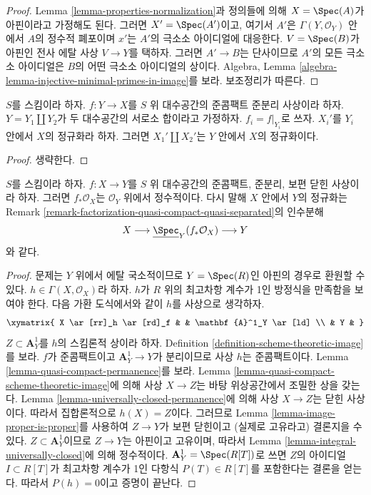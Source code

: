 \begin{proof}
Lemma \ref{lemma-properties-normalization}과 정의들에 의해
$X = \Spec(A)$가 아핀이라고 가정해도 된다. 그러면
$X' = \Spec(A')$이고, 여기서 $A'$은 $\Gamma(Y, \mathcal{O}_Y)$ 안에서
$A$의 정수적 폐포이며 $x'$는 $A'$의 극소소 아이디얼에 대응한다.
$V = \Spec(B)$가 아핀인 전사 에탈 사상 $V \to Y$를 택하자. 그러면
$A' \to B$는 단사이므로 $A'$의 모든 극소소 아이디얼은 $B$의 어떤
극소소 아이디얼의 상이다. Algebra, Lemma
\ref{algebra-lemma-injective-minimal-primes-in-image}를 보라. 보조정리가
따른다.
\end{proof}

\begin{lemma}
\label{lemma-normalization-in-disjoint-union}
$S$를 스킴이라 하자.
$f : Y \to X$를 $S$ 위 대수공간의 준콤팩트 준분리 사상이라 하자.
$Y = Y_1 \amalg Y_2$가 두 대수공간의 서로소 합이라고 가정하자.
$f_i = f|_{Y_i}$로 쓰자. $X_i'$를 $Y_i$ 안에서 $X$의 정규화라 하자.
그러면 $X_1' \amalg X_2'$는 $Y$ 안에서 $X$의 정규화이다.
\end{lemma}

\begin{proof}
생략한다.
\end{proof}

\begin{lemma}
\label{lemma-normalization-in-universally-closed}
$S$를 스킴이라 하자.
$f : X \to Y$를 $S$ 위 대수공간의 준콤팩트, 준분리, 보편 닫힌 사상이라
하자. 그러면 $f_*\mathcal{O}_X$는 $\mathcal{O}_Y$ 위에서 정수적이다.
다시 말해 $X$ 안에서 $Y$의 정규화는 Remark
\ref{remark-factorization-quasi-compact-quasi-separated}의 인수분해
$$
X \longrightarrow \underline{\Spec}_Y(f_*\mathcal{O}_X)
\longrightarrow Y
$$
와 같다.
\end{lemma}

\begin{proof}
문제는 $Y$ 위에서 에탈 국소적이므로 $Y = \Spec(R)$인 아핀의 경우로
환원할 수 있다. $h \in \Gamma(X, \mathcal{O}_X)$라 하자. $h$가 $R$ 위의
최고차항 계수가 1인 방정식을 만족함을 보여야 한다. 다음 가환 도식에서와
같이 $h$를 사상으로 생각하자.
$$
\xymatrix{
X \ar[rr]_h \ar[rd]_f & & \mathbf{A}^1_Y \ar[ld] \\
& Y &
}
$$
$Z \subset \mathbf{A}^1_Y$를 $h$의 스킴론적 상이라 하자. Definition
\ref{definition-scheme-theoretic-image}를 보라. $f$가 준콤팩트이고
$\mathbf{A}^1_Y \to Y$가 분리이므로 사상 $h$는 준콤팩트이다. Lemma
\ref{lemma-quasi-compact-permanence}를 보라. Lemma
\ref{lemma-quasi-compact-scheme-theoretic-image}에 의해 사상 $X \to Z$는
바탕 위상공간에서 조밀한 상을 갖는다. Lemma
\ref{lemma-universally-closed-permanence}에 의해 사상 $X \to Z$는
닫힌 사상이다. 따라서 집합론적으로 $h(X) = Z$이다. 그러므로 Lemma
\ref{lemma-image-proper-is-proper}를 사용하여 $Z \to Y$가 보편 닫힌이고
(실제로 고유라고) 결론지을 수 있다. $Z \subset \mathbf{A}^1_Y$이므로
$Z \to Y$는 아핀이고 고유이며, 따라서 Lemma
\ref{lemma-integral-universally-closed}에 의해 정수적이다.
$\mathbf{A}^1_Y = \Spec(R[T])$로 쓰면 $Z$의 아이디얼
$I \subset R[T]$가 최고차항 계수가 1인 다항식
$P(T) \in R[T]$를 포함한다는 결론을 얻는다. 따라서 $P(h) = 0$이고
증명이 끝난다.
\end{proof}

